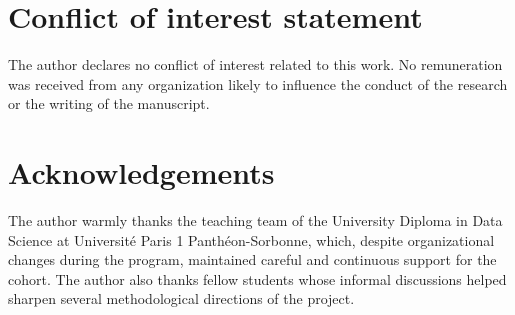 \documentclass[ROIA,Unicode]{cedram}
\begin{document}
\section*{Conflict of interest statement}
The author declares no conflict of interest related to this work. No remuneration was received from any organization likely to influence the conduct of the research or the writing of the manuscript.

\section*{Acknowledgements}
The author warmly thanks the teaching team of the University Diploma in Data Science at Université Paris 1 Panthéon-Sorbonne, which, despite organizational changes during the program, maintained careful and continuous support for the cohort. The author also thanks fellow students whose informal discussions helped sharpen several methodological directions of the project.


\end{document}
